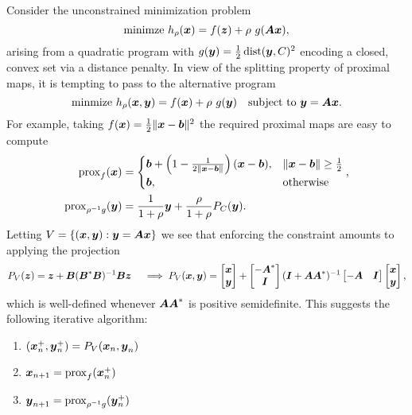 \documentclass{article}
\begin{document}
Consider the unconstrained minimization problem
\begin{equation*}
    \mathrm{minimze}~h_{\rho}(\boldsymbol{x})
    =
    f(\boldsymbol{z})
    +
    \rho~g(\boldsymbol{A} \boldsymbol{x}),
\end{equation*}
arising from a quadratic program with \(g(\boldsymbol{y}) = \frac{1}{2}\mathop{\rm dist}\nolimits(\boldsymbol{y}, C)^{2}\) encoding a closed, convex set via a distance penalty.
In view of the splitting property of proximal maps, it is tempting to pass to the alternative program
\begin{equation*}
    \mathrm{minmize}~h_{\rho}(\boldsymbol{x}, \boldsymbol{y}) =
        f(\boldsymbol{x}) + \rho~g(\boldsymbol{y})
    \quad \text{subject to}~\boldsymbol{y} = \boldsymbol{A} \boldsymbol{x}.
\end{equation*}
For example, taking \(f(\boldsymbol{x}) = \frac{1}{2} \|\boldsymbol{x} - \boldsymbol{b}\|^{2}\) the required proximal maps are easy to compute
\begin{equation*}
    \begin{split}
        \mathop{\rm prox}\nolimits_{f}(\boldsymbol{x})
        &=
        \begin{cases}
            \boldsymbol{b} + \left(1 - \frac{1}{2 \|\boldsymbol{x} - \boldsymbol{b}\|}\right) (\boldsymbol{x} - \boldsymbol{b}),
                & \|\boldsymbol{x} - \boldsymbol{b}\| \ge \frac{1}{2} \\
            \boldsymbol{b},
                & \text{otherwise}
        \end{cases}, \\
        \mathop{\rm prox}\nolimits_{\rho^{-1} g}(\boldsymbol{y})
        &=
        \frac{1}{1 + \rho} \boldsymbol{y}
            + \frac{\rho}{1 + \rho} P_{C}(\boldsymbol{y}).
    \end{split}
\end{equation*}
Letting \(V = \{(\boldsymbol{x}, \boldsymbol{y}) : \boldsymbol{y} = \boldsymbol{A} \boldsymbol{x}\}\) we see that enforcing the constraint amounts to applying the projection 
\begin{equation*}
    P_{V}(\boldsymbol{z}) = \boldsymbol{z} + \boldsymbol{B} (\boldsymbol{B}^{\ast}\boldsymbol{B})^{-1}\boldsymbol{B} \boldsymbol{z}
    \quad
    \implies
    P_{V}(\boldsymbol{x}, \boldsymbol{y})
    =
    \begin{bmatrix}
        \boldsymbol{x} \\
        \boldsymbol{y}
    \end{bmatrix}
    +
    \begin{bmatrix}
        -\boldsymbol{A}^{\ast} \\
        \boldsymbol{I}
    \end{bmatrix}
    (\boldsymbol{I} + \boldsymbol{A} \boldsymbol{A}^{\ast})^{-1}
    \begin{bmatrix}
        -\boldsymbol{A}
        & \boldsymbol{I}
    \end{bmatrix}
    \begin{bmatrix}
        \boldsymbol{x} \\
        \boldsymbol{y}
    \end{bmatrix},
\end{equation*}
which is well-defined whenever \(\boldsymbol{A} \boldsymbol{A}^{\ast}\) is positive semidefinite.
This suggests the following iterative algorithm:
\begin{enumerate}
    \item \((\boldsymbol{x}_{n}^{+}, \boldsymbol{y}_{n}^{+}) = P_{V}(\boldsymbol{x}_{n}, \boldsymbol{y}_{n})\)
    \item \(\boldsymbol{x}_{n+1} = \mathop{\rm prox}\nolimits_{f}(\boldsymbol{x}_{n}^{+})\)
    \item \(\boldsymbol{y}_{n+1} = \mathop{\rm prox}\nolimits_{\rho^{-1}g}(\boldsymbol{y}_{n}^{+})\)
\end{enumerate}
\end{document}
